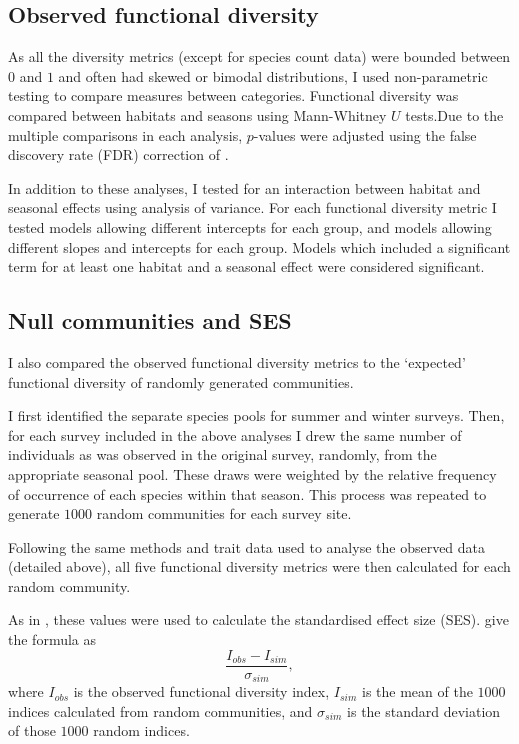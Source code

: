 \documentclass[12pt,a4paper]{book}
\begin{document}
\subsection{Observed functional diversity}

As all the diversity metrics (except for species count data) were bounded between $0$ and $1$  and often had skewed or bimodal distributions, I used non-parametric testing to compare measures between categories. Functional diversity was compared between habitats and seasons using Mann-Whitney $U$ tests.Due to the multiple comparisons in each analysis, $p$-values were adjusted using the false discovery rate (FDR) correction of \citet{Benjamini1995}.

In addition to these analyses, I tested for an interaction between habitat and seasonal effects using analysis of variance. For each functional diversity metric I tested models allowing different intercepts for each group, and models allowing different slopes and intercepts for each group. Models which included a significant term for at least one habitat and a seasonal effect were considered significant.

\subsection{Null communities and SES}

I also compared the observed functional diversity metrics to the `expected' functional diversity of randomly generated communities.

I first identified the separate species pools for summer and winter surveys. Then, for each survey included in the above analyses I drew the same number of individuals as was observed in the original survey, randomly, from the appropriate seasonal pool. These draws were weighted by the relative frequency of occurrence of each species within that season. This process was repeated to generate $1000$ random communities for each survey site.

Following the same methods and trait data used to analyse the observed data (detailed above), all five functional diversity metrics were then calculated for each random community.

As in \citet{Mendez2012}, these values were used to calculate the standardised effect size (SES). \citet{Gotelli2002} give the formula as
\begin{equation}
\frac{I_{obs} - I_{sim}}{\sigma_{sim}},
\end{equation}
where $I_{obs}$ is the observed functional diversity index, $I_{sim}$ is the mean of the $1000$ indices calculated from random communities, and $\sigma_{sim}$ is the standard deviation of those $1000$ random indices.
\end{document}
